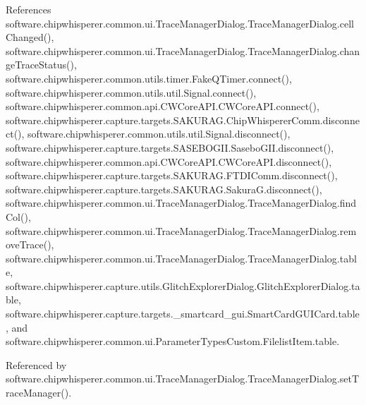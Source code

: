 References software.\+chipwhisperer.\+common.\+ui.\+Trace\+Manager\+Dialog.\+Trace\+Manager\+Dialog.\+cell\+Changed(), software.\+chipwhisperer.\+common.\+ui.\+Trace\+Manager\+Dialog.\+Trace\+Manager\+Dialog.\+change\+Trace\+Status(), software.\+chipwhisperer.\+common.\+utils.\+timer.\+Fake\+Q\+Timer.\+connect(), software.\+chipwhisperer.\+common.\+utils.\+util.\+Signal.\+connect(), software.\+chipwhisperer.\+common.\+api.\+C\+W\+Core\+A\+P\+I.\+C\+W\+Core\+A\+P\+I.\+connect(), software.\+chipwhisperer.\+capture.\+targets.\+S\+A\+K\+U\+R\+A\+G.\+Chip\+Whisperer\+Comm.\+disconnect(), software.\+chipwhisperer.\+common.\+utils.\+util.\+Signal.\+disconnect(), software.\+chipwhisperer.\+capture.\+targets.\+S\+A\+S\+E\+B\+O\+G\+I\+I.\+Sasebo\+G\+I\+I.\+disconnect(), software.\+chipwhisperer.\+common.\+api.\+C\+W\+Core\+A\+P\+I.\+C\+W\+Core\+A\+P\+I.\+disconnect(), software.\+chipwhisperer.\+capture.\+targets.\+S\+A\+K\+U\+R\+A\+G.\+F\+T\+D\+I\+Comm.\+disconnect(), software.\+chipwhisperer.\+capture.\+targets.\+S\+A\+K\+U\+R\+A\+G.\+Sakura\+G.\+disconnect(), software.\+chipwhisperer.\+common.\+ui.\+Trace\+Manager\+Dialog.\+Trace\+Manager\+Dialog.\+find\+Col(), software.\+chipwhisperer.\+common.\+ui.\+Trace\+Manager\+Dialog.\+Trace\+Manager\+Dialog.\+remove\+Trace(), software.\+chipwhisperer.\+common.\+ui.\+Trace\+Manager\+Dialog.\+Trace\+Manager\+Dialog.\+table, software.\+chipwhisperer.\+capture.\+utils.\+Glitch\+Explorer\+Dialog.\+Glitch\+Explorer\+Dialog.\+table, software.\+chipwhisperer.\+capture.\+targets.\+\_\+smartcard\+\_\+gui.\+Smart\+Card\+G\+U\+I\+Card.\+table, and software.\+chipwhisperer.\+common.\+ui.\+Parameter\+Types\+Custom.\+Filelist\+Item.\+table.



Referenced by software.\+chipwhisperer.\+common.\+ui.\+Trace\+Manager\+Dialog.\+Trace\+Manager\+Dialog.\+set\+Trace\+Manager().


